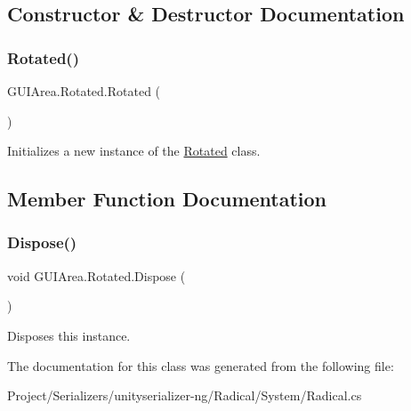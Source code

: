 \subsection{Constructor \& Destructor Documentation}
\mbox{\label{class_g_u_i_area_1_1_rotated_aef2a3cc9bd58adba4b23485f85a74f1f}} 
\subsubsection{\texorpdfstring{Rotated()}{Rotated()}}
{\footnotesize\ttfamily G\+U\+I\+Area.\+Rotated.\+Rotated (\begin{DoxyParamCaption}{ }\end{DoxyParamCaption})\hspace{0.3cm}{\ttfamily [inline]}}



Initializes a new instance of the \hyperlink{class_g_u_i_area_1_1_rotated}{Rotated} class. 



\subsection{Member Function Documentation}
\mbox{\label{class_g_u_i_area_1_1_rotated_af137ea603de7ba13455a900b95670d2b}} 
\subsubsection{\texorpdfstring{Dispose()}{Dispose()}}
{\footnotesize\ttfamily void G\+U\+I\+Area.\+Rotated.\+Dispose (\begin{DoxyParamCaption}{ }\end{DoxyParamCaption})\hspace{0.3cm}{\ttfamily [inline]}}



Disposes this instance. 



The documentation for this class was generated from the following file\+:\begin{DoxyCompactItemize}
\item 
Project/\+Serializers/unityserializer-\/ng/\+Radical/\+System/Radical.\+cs\end{DoxyCompactItemize}
